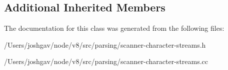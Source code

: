 \subsection*{Additional Inherited Members}


The documentation for this class was generated from the following files\+:\begin{DoxyCompactItemize}
\item 
/\+Users/joshgav/node/v8/src/parsing/scanner-\/character-\/streams.\+h\item 
/\+Users/joshgav/node/v8/src/parsing/scanner-\/character-\/streams.\+cc\end{DoxyCompactItemize}
